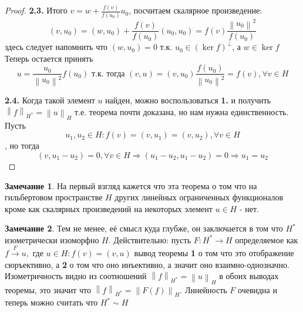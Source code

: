 \documentclass[12pt,a4paper]{article}
\theoremstyle{definition}
\newtheorem{corollaryth}{Замечание}[theorem]
\newcommand{\norm}[1]{\left\lVert#1\right\rVert}
\begin{document}
\begin{proof}
	\textbf{2.3.} Итого $v = w + \frac{f(v)}{f(u_0)} u_0$, посчитаем скалярное произведение:
	$$(v, u_0) = (w, u_0) + \frac{f(v)}{f(u_0)} (u_0, u_0) = f(v) \frac{\norm{u_0}^2}{f(u_0)}$$
	здесь следует напомнить что $(w, u_0) = 0$ т.к. $u_0 \in (\ker{f})^\perp$, а $w \in \ker{f}$
	Теперь остается принять 
	$$u = \frac{u_0}{\norm{u_0}^2} f(u_0) \text{ т.к. тогда } (v, u) = (v, u_0) \frac{f(u_0)}{\norm{u_0}^2} = f(v), \forall v \in H$$
	
	\textbf{2.4.} Когда такой элемент $u$ найден, можно воспользоваться \textbf{1.} и получить $\norm{f}_{H^*} = \norm{u}_H$ т.е. теорема почти доказана, но нам нужна единственность. Пусть 
	$$u_1, u_2 \in H: f(v) = (v, u_1) = (v, u_2), \forall v\in H$$
	, но тогда
	$$(v, u_1 - u_2) = 0,\forall v \in H \Rightarrow (u_1 - u_2, u_1 - u_2) = 0 \Rightarrow u_1 = u_2$$
	
	
\end{proof}
\begin{corollaryth}
	На первый взгляд кажется что эта теорема о том что на гильбертовом пространстве $H$ других линейных ограниченных функционалов кроме как скалярных произведений на некоторых элемент $u\in H$ - нет.
\end{corollaryth}
\begin{corollaryth}
	Тем не менее, её смысл куда глубже, он заключается в том что $H^*$ изометрически изоморфно $H$. Действительно: пусть $F: H^* \to H$ определяемое как $f \xrightarrow{F} u, \text{ где } u \in H: f(v) = (v,u)$ вывод теоремы \textbf{1} о том что это отображение сюръективно, а \textbf{2} о том что оно инъективно, а значит оно взаимно-однозначно. Изометричность видно из соотношений $\norm{f}_{H^*} = \norm{u}_H$ в обоих выводах теоремы, это значит что $\norm{f}_{H^*} = \norm{F(f)}_H$. Линейность $F$ очевидна и теперь можно считать что $H^* \sim H$
\end{corollaryth}
\end{document}
